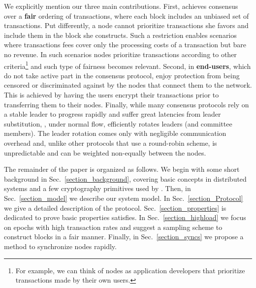 We explicitly mention our three main contributions. First, \name achieves consensus over a \textbf{fair} ordering of transactions, where each block includes an unbiased set of transactions. Put differently, a node cannot prioritize transactions she favors and include them in the block she constructs. Such a restriction enables scenarios where transactions fees cover only the processing costs of a transaction but bare no revenue. In such scenarios nodes prioritize transactions according to other criteria\footnote{For example, we can think of nodes as application developers that prioritize transactions made by their own users.} and such type of fairness becomes relevant. Second, in \name \textbf{end-users}, which do not take active part in the consensus protocol, enjoy protection from being censored or discriminated against by the nodes that connect them to the network. This is achieved by having the users encrypt their transactions prior to transferring them to their nodes. Finally, while many consensus protocols rely on a stable leader to progress rapidly and suffer great latencies from leader substitution, \nameNS, under normal flow, efficiently rotates leaders (and committee members). The leader rotation comes only with negligible communication overhead and, unlike other protocols that use a round-robin scheme, is unpredictable and can be weighted non-equally between the nodes. 

The remainder of the paper is organized as follows. We begin with some short background in Sec.~\ref{section_background}, covering basic concepts in distributed systems and a few cryptography primitives used by \nameNS. Then, in Sec.~\ref{section_model} we describe our system model. In Sec.~\ref{section_Protocol} we give a detailed description of the \name protocol. Sec.~\ref{section_properties} is dedicated to prove basic properties \name satisfies. In Sec.~\ref{section_highload} we focus on epochs with high transaction rates and suggest a sampling scheme to construct blocks in a fair manner. Finally, in Sec.~\ref{section_syncs} we propose a method to synchronize nodes rapidly.